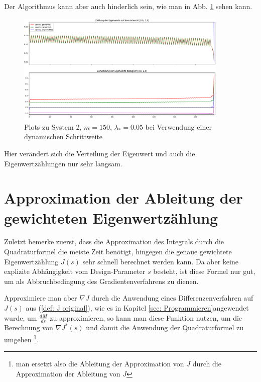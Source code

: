 \documentclass[a4paper,12pt]{report}
\newcommand{\1}{\mathds{1}}
\theoremstyle{plain} %
\theoremstyle{definition} %
\theoremstyle{remark}
\begin{document}
            Der Algorithmus kann aber auch hinderlich sein, wie man in Abb. \ref{fig: Plot_2_150_0.05_dynamischSchritt} sehen kann.
            \begin{figure}[h!t]
                  \centering
                  \includegraphics[width=0.9\textwidth, keepaspectratio]{./dynamischSchritt/Plot_2_150_0.05.png}
                  \caption[Plots zu System 2, $m=150$, $\lambda_*=0.05$, dynamische Schrittweite]{Plots zu System 2, $m=150$, $\lambda_*=0.05$ bei Verwendung einer dynamischen Schrittweite}
                  \label{fig: Plot_2_150_0.05_dynamischSchritt}
            \end{figure}

            Hier verändert sich die Verteilung der Eigenwert und auch die Eigenwertzählungen nur sehr langsam.

      \section{Approximation der Ableitung der gewichteten Eigenwertzählung}

            Zuletzt bemerke zuerst, dass die Approximation des Integrals durch die Quadraturformel die meiste Zeit benötigt,
            hingegen die genaue gewichtete Eigenwertzählung $J(s)$ sehr schnell berechnet werden kann.
            Da aber keine explizite Abhängigkeit vom Design-Parameter $s$ besteht, ist diese Formel nur gut, um als Abbruchbedingung des Gradientenverfahrens zu dienen.

            Approximiere man aber $\nabla J$ durch die Anwendung eines Differenzenverfahren auf $J(s)$ aus (\ref{def: J original}),
            wie es in Kapitel \ref{sec: Programmieren}angewendet wurde, um $\frac {dM}{ds}$ zu approximieren,
            so kann man diese Funktion nutzen, um die Berechnung von $\nabla J^*(s)$ und damit die Anwendung der Quadraturformel zu umgehen
            \footnote{man ersetzt also die Ableitung der Approximation von $J$ durch die Approximation der Ableitung von $J$}.
\end{document}
